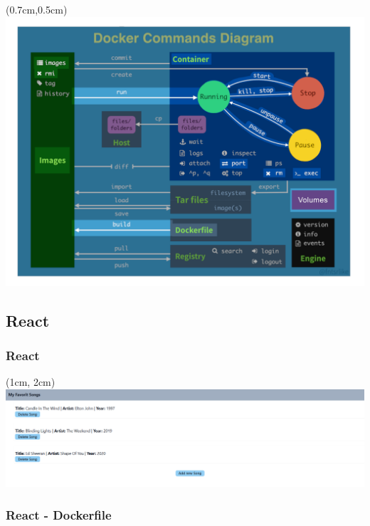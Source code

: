 \documentclass[22pt]{beamer}
\begin{document}
\begin{frame}[t]
    \begin{textblock*}{\paperwidth}(0.7cm,0.5cm) %
        \includegraphics[width=0.9\paperwidth]{Bilder/Commands_Zf.png}
    \end{textblock*}
\end{frame}  

\subsection{React}

    
\begin{frame}[c]
    \frametitle{React}
    \begin{textblock*}{\paperwidth}(1cm, 2cm) %
        \includegraphics[width=0.85\paperwidth]{Bilder/Webseite.png}
    \end{textblock*}
\end{frame}

\begin{frame}[fragile]
    \frametitle{React - Dockerfile}
    \inputminted[fontsize=\footnotesize, frame=lines]{dockerfile}{../examples/React/Dockerfile}
\end{frame}
\end{document}
